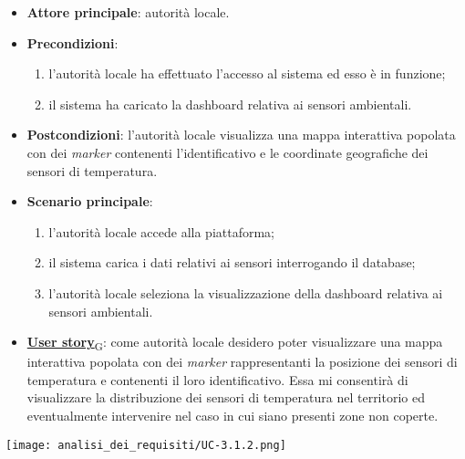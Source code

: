 \begin{itemize}
	\item \textbf{Attore principale}: autorità locale.
	\item \textbf{Precondizioni}:
	      \begin{enumerate}
		      \item l'autorità locale ha effettuato l'accesso al sistema ed esso è in funzione;
		      \item il sistema ha caricato la dashboard relativa ai sensori ambientali.
	      \end{enumerate}
	\item \textbf{Postcondizioni}: l'autorità locale visualizza una mappa interattiva popolata con dei \textit{marker} contenenti l'identificativo e le coordinate geografiche dei sensori di temperatura.
	\item \textbf{Scenario principale}:
	      \begin{enumerate}
		      \item l'autorità locale accede alla piattaforma;
		      \item il sistema carica i dati relativi ai sensori interrogando il database;
		      \item l'autorità locale seleziona la visualizzazione della dashboard relativa ai sensori ambientali.
	      \end{enumerate}
	\item \href{https://7last.github.io/docs/pb/documentazione-interna/glossario\#user-story}{\textbf{User story}\textsubscript{G}}:
	      come autorità locale desidero poter visualizzare una mappa interattiva popolata con dei \textit{marker} rappresentanti la posizione dei sensori di temperatura e contenenti il loro identificativo. Essa mi consentirà di visualizzare la distribuzione dei sensori di temperatura nel territorio ed eventualmente intervenire nel caso in cui siano presenti zone non coperte.
\end{itemize}
\begin{center}
	\texttt{[image: analisi\_dei\_requisiti/UC-3.1.2.png]}
\end{center}


